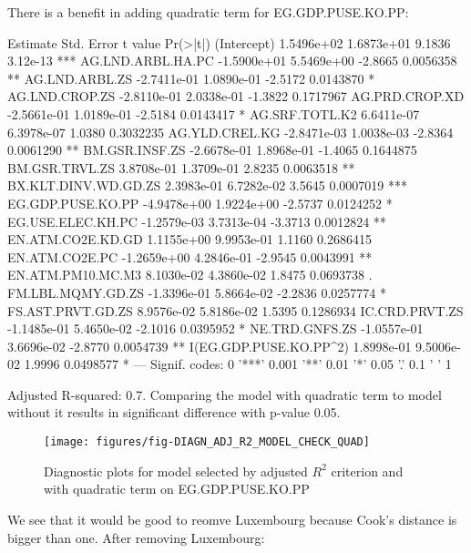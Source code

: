 \documentclass[a4paper]{article}
\begin{document}
There is a benefit in adding quadratic term for EG.GDP.PUSE.KO.PP:
\begin{Schunk}
\begin{Soutput}
                          Estimate  Std. Error t value  Pr(>|t|)    
(Intercept)             1.5496e+02  1.6873e+01  9.1836  3.12e-13 ***
AG.LND.ARBL.HA.PC      -1.5900e+01  5.5469e+00 -2.8665 0.0056358 ** 
AG.LND.ARBL.ZS         -2.7411e-01  1.0890e-01 -2.5172 0.0143870 *  
AG.LND.CROP.ZS         -2.8110e-01  2.0338e-01 -1.3822 0.1717967    
AG.PRD.CROP.XD         -2.5661e-01  1.0189e-01 -2.5184 0.0143417 *  
AG.SRF.TOTL.K2          6.6411e-07  6.3978e-07  1.0380 0.3032235    
AG.YLD.CREL.KG         -2.8471e-03  1.0038e-03 -2.8364 0.0061290 ** 
BM.GSR.INSF.ZS         -2.6678e-01  1.8968e-01 -1.4065 0.1644875    
BM.GSR.TRVL.ZS          3.8708e-01  1.3709e-01  2.8235 0.0063518 ** 
BX.KLT.DINV.WD.GD.ZS    2.3983e-01  6.7282e-02  3.5645 0.0007019 ***
EG.GDP.PUSE.KO.PP      -4.9478e+00  1.9224e+00 -2.5737 0.0124252 *  
EG.USE.ELEC.KH.PC      -1.2579e-03  3.7313e-04 -3.3713 0.0012824 ** 
EN.ATM.CO2E.KD.GD       1.1155e+00  9.9953e-01  1.1160 0.2686415    
EN.ATM.CO2E.PC         -1.2659e+00  4.2846e-01 -2.9545 0.0043991 ** 
EN.ATM.PM10.MC.M3       8.1030e-02  4.3860e-02  1.8475 0.0693738 .  
FM.LBL.MQMY.GD.ZS      -1.3396e-01  5.8664e-02 -2.2836 0.0257774 *  
FS.AST.PRVT.GD.ZS       8.9576e-02  5.8186e-02  1.5395 0.1286934    
IC.CRD.PRVT.ZS         -1.1485e-01  5.4650e-02 -2.1016 0.0395952 *  
NE.TRD.GNFS.ZS         -1.0557e-01  3.6696e-02 -2.8770 0.0054739 ** 
I(EG.GDP.PUSE.KO.PP^2)  1.8998e-01  9.5006e-02  1.9996 0.0498577 *  
---
Signif. codes:  0 '***' 0.001 '**' 0.01 '*' 0.05 '.' 0.1 ' ' 1
\end{Soutput}
\end{Schunk}
Adjusted R-squared:
0.7. Comparing the
model with quadratic term to model without it results in significant difference
with p-value 0.05.

\begin{figure}[H]
\begin{center}
\texttt{[image: figures/fig-DIAGN\_ADJ\_R2\_MODEL\_CHECK\_QUAD]}
\caption{Diagnostic plots for model selected by adjusted $R^2$ criterion
and with quadratic term on EG.GDP.PUSE.KO.PP}
\end{center}
\end{figure}

We see that it would be good to reomve Luxembourg because Cook's distance is bigger
than one. After removing Luxembourg:
		
\end{document}
